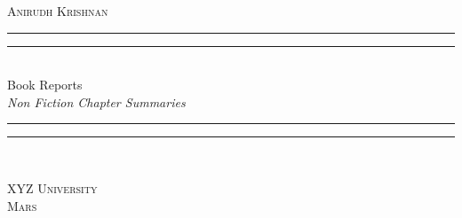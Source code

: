 \begin{titlepage}
\centering
	\settowidth{\unitlength}{\LARGE THE BOOK OF CONUNDRUMS}
	\vspace*{\baselineskip}
	{\large\scshape Anirudh Krishnan}\\[\baselineskip]
	\rule{\unitlength}{1.6pt}\vspace*{-\baselineskip}\vspace*{2pt}
	\rule{\unitlength}{0.4pt}\\[\baselineskip]
	{\LARGE Book Reports}\\[\baselineskip]
	{\itshape Non Fiction Chapter Summaries}\\[0.2\baselineskip]
	\rule{\unitlength}{0.4pt}\vspace*{-\baselineskip}\vspace{3.2pt}
	\rule{\unitlength}{1.6pt}\\[\baselineskip]
	\par
	\vfill
	{\large\scshape XYZ University}\\[\baselineskip]
	{\small\scshape Mars}\par
	\vspace*{0.1\textheight}
\end{titlepage}
